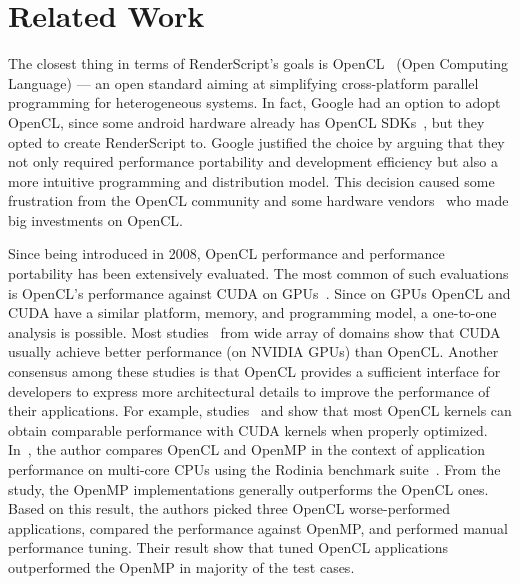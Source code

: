 \section*{Related Work}

The closest thing in terms of RenderScript's goals is OpenCL~\cite{OpenCL} (Open Computing Language)
 --- an open standard aiming at simplifying cross-platform
parallel programming for heterogeneous systems.
In fact, Google had an option to adopt OpenCL, since some android hardware
    already has OpenCL SDKs~\cite{OpenCL:Android}, but they opted to create
    RenderScript to.
Google justified the choice by arguing that they not only required 
    performance portability and development efficiency but also a
    more intuitive programming and distribution model.
This decision caused some frustration from the OpenCL community
\cite{androidblockopenCL} and some hardware 
    vendors~\cite{googlelockin} who made big investments on OpenCL.

Since being introduced in 2008, OpenCL performance and performance portability has
been extensively evaluated.
The most common of such evaluations is OpenCL's performance against CUDA on
    GPUs~\cite{fang2011comprehensive, weber2011comparing,
van2011correlating, vassilev2010comparison, amorim2009comparing,
karimi2010performance, komatsu2010evaluating}.
Since on GPUs OpenCL and CUDA have a similar
 platform, memory, and programming model, a one-to-one analysis is possible.
Most
studies~\cite{weber2011comparing, van2011correlating, vassilev2010comparison,
amorim2009comparing}  from wide array of domains show that
CUDA usually achieve better performance (on NVIDIA GPUs) than
OpenCL.
Another consensus among these studies is that OpenCL provides a sufficient
interface for developers to express more architectural details to improve the
performance of their applications.
For example,
studies~\cite{komatsu2010evaluating} and \cite{fang2011comprehensive} show that
most OpenCL kernels can obtain
comparable performance with CUDA kernels when properly optimized. 
In~\cite{shen2012performance}, the author
compares OpenCL and OpenMP in the context of application performance on
multi-core CPUs using the Rodinia benchmark suite~\cite{che2009rodinia}.
From the study, the OpenMP implementations generally outperforms the OpenCL ones.
Based on this result, the authors picked three OpenCL worse-performed
applications, compared the performance against OpenMP, and performed manual performance tuning.
Their
result show that tuned OpenCL applications outperformed the 
OpenMP in majority of the test cases.

